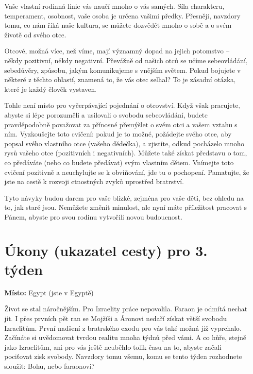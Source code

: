 \documentclass[11pt]{article}
\begin{document}
Vaše vlastní rodinná linie vás naučí mnoho o vás samých. Síla charakteru, temperament, osobnost, vaše osoba je určena vašimi
předky. Přesněji, navzdory tomu, co nám říká naše kultura, se můžete dozvědět mnoho o sobě a o svém životě od svého otce.

Otcové, možná více, než víme, mají významný dopad na jejich potomstvo – někdy pozitivní, někdy negativní. Převážně od
našich otců se učíme sebeovládání, sebedůvěry, způsobu, jakým komunikujeme s vnějším světem. Pokud bojujete v některé z
těchto oblastí, znamená to, že vás otec selhal? To je zásadní otázka, které je každý člověk vystaven.

Tohle není místo pro vyčerpávající pojednání o otcovství. Když však pracujete, abyste si lépe porozuměli a usilovali o svobodu
sebeovládání, budete pravděpodobně považovat za přínosné přemýšlet o svém otci a vašem vztahu s ním. Vyzkoušejte toto
cvičení: pokud je to možné, požádejte svého otce, aby popsal svého vlastního otce (vašeho dědečka), a zjistíte, odkud pocházelo
mnoho rysů vašeho otce (pozitivních i negativních). Můžete také získat představu o tom, co předáváte (nebo co budete předávat)
svým vlastním dětem. Vnímejte toto cvičení pozitivně a neuchylujte se k obviňování, jde tu o pochopení. Pamatujte, že jste na
cestě k rozvoji ctnostných zvyků uprostřed bratrství. 

Tyto návyky budou darem pro vaše blízké, zejména pro vaše děti, bez
ohledu na to, jak staré jsou. Nemůžete změnit minulost, ale nyní máte příležitost pracovat s Pánem, abyste pro svou rodinu
vytvořili novou budoucnost.


\newpage
\section*{Úkony (ukazatel cesty) pro 3. týden}

\textbf{Místo:} Egypt (jste v Egyptě)

Život se stal náročnějším. Pro Izraelity práce nepovolila. Faraon je odmítá nechat jít. I přes prvních pět ran se Mojžíši a Áronovi nedaří získat větší svobodu Izraelitům. První nadšení z bratrského exodu pro vás také možná již vyprchalo. Začínáte si uvědomovat tvrdou realitu mnoha týdnů před vámi. A co hůře, stejně jako Izraelitům, ani pro vás ještě neuběhlo tolik času na to, abyste začali pociťovat zisk svobody. Navzdory tomu všemu, komu se tento týden rozhodnete sloužit: Bohu, nebo faraonovi?
\end{document}
